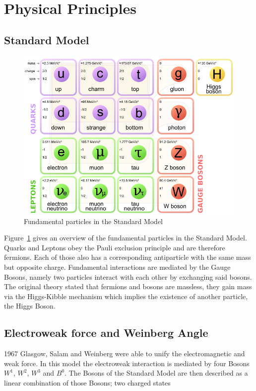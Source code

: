 
\section{Physical Principles}
\subsection{Standard Model}
\begin{figure}[hb]
	\centering
	\includegraphics[scale=0.25]{graphics/Standard_Model_of_Elementary_Particles.png}
	\caption{Fundamental particles in the Standard Model}
	\label{fig:principles:Standard_Model_of_Elementary_Particles}
\end{figure}

Figure~\ref{fig:principles:Standard_Model_of_Elementary_Particles} gives an overview of the fundamental particles in the Standard Model. Quarks and Leptons obey the Pauli exclusion principle and are therefore fermions. Each of those also has a corresponding antiparticle with the same mass but opposite charge. Fundamental interactions are mediated by the Gauge Bosons, namely two particles interact with each other by exchanging said bosons. The original theory stated that fermions and bosons are massless, they gain mass via the Higgs-Kibble mechanism which implies the existence of another particle, the Higgs Boson\cite{muenchen}.

\subsection{Electroweak force and Weinberg Angle}
1967 Glasgow, Salam and Weinberg were able to unify the electromagnetic and weak force. In this model the electroweak interaction is mediated by four Bosons $W^1$, $W^2$, $W^3$ and $B^0$. The Bosons of the Standard Model are then described as a linear combination of those Bosons; two charged states

